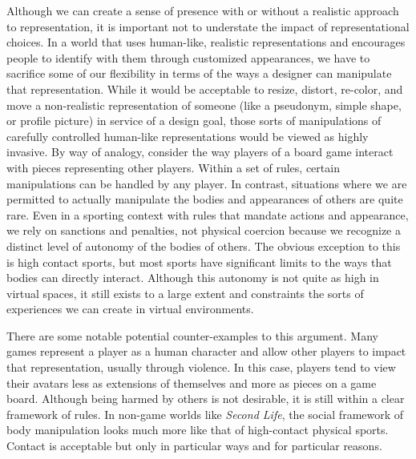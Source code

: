 Although we can create a sense of presence with or without a realistic approach to representation, it is important not to understate the impact of representational choices. In a world that uses human-like, realistic representations and encourages people to identify with them through customized appearances, we have to sacrifice some of our flexibility in terms of the ways a designer can manipulate that representation. While it would be acceptable to resize, distort, re-color, and move a non-realistic representation of someone (like a pseudonym, simple shape, or profile picture) in service of a design goal, those sorts of manipulations of carefully controlled human-like representations would be viewed as highly invasive. By way of analogy, consider the way players of a board game interact with pieces representing other players. Within a set of rules, certain manipulations can be handled by any player. In contrast, situations where we are permitted to actually manipulate the bodies and appearances of others are quite rare. Even in a sporting context with rules that mandate actions and appearance, we rely on sanctions and penalties, not physical coercion because we recognize a distinct level of autonomy of the bodies of others. The obvious exception to this is high contact sports, but most sports have significant limits to the ways that bodies can directly interact. Although this autonomy is not quite as high in virtual spaces, it still exists to a large extent and constraints the sorts of experiences we can create in virtual environments. 

There are some notable potential counter-examples to this argument. Many games represent a player as a human character and allow other players to impact that representation, usually through violence. In this case, players tend to view their avatars less as extensions of themselves and more as pieces on a game board. Although being harmed by others is not desirable, it is still within a clear framework of rules. In non-game worlds like \emph{Second Life}, the social framework of body manipulation looks much more like that of high-contact physical sports. Contact is acceptable but only in particular ways and for particular reasons.


